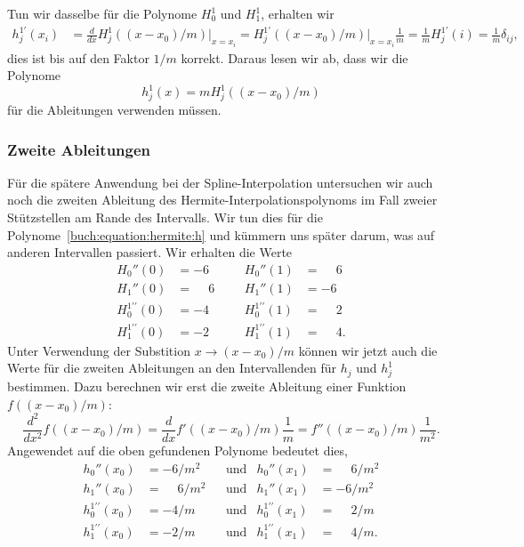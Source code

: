 Tun wir dasselbe für die Polynome $H_0^1$ und $H_1^1$, erhalten wir
\begin{align*}
h_j^{1\prime}(x_i)
&=
\frac{d}{dx} H_j^1((x-x_0)/m) \bigg|_{x=x_i}
=
H_j^{1\prime}((x-x_0)/m)\bigg|_{x=x_i} \frac{1}{m}
=
\frac1m
H_j^{1\prime}(i)
=
\frac1m\delta_{ij},
\end{align*}
dies ist bis auf den Faktor $1/m$ korrekt.
Daraus lesen wir ab, dass wir die Polynome
\[
h_j^1(x)
=
mH_j^1((x-x_0)/m)
\]
für die Ableitungen verwenden müssen.

\subsubsection{Zweite Ableitungen}
%
%
%
Für die spätere Anwendung bei der Spline-Interpolation untersuchen
wir auch noch die zweiten Ableitung des Hermite-Interpolationspolynoms
im Fall zweier Stützstellen am Rande des Intervalls.
Wir tun dies für die Polynome~\eqref{buch:equation:hermite:h}
und kümmern uns später darum, was auf anderen Intervallen passiert.
Wir erhalten die Werte
\[
\begin{aligned}
H_0''(0)                &= -6 &&&  H_0''(1)                &=  \phantom{-}6
\\
H_1''(0)                &=\phantom{-}6 &&&  H_1''(1)       &= -6
\\
H_0^{1\prime\prime}(0)  &= -4 &&&  H_0^{1\prime\prime}(1)  &=  \phantom{-}2
\\
H_1^{1\prime\prime}(0)  &= -2 &&&  H_1^{1\prime\prime}(1)  &=  \phantom{-}4.
\end{aligned}
\]
Unter Verwendung der Substition $x\to (x-x_0)/m$ können wir jetzt auch
die Werte für die zweiten Ableitungen an den Intervallenden für $h_j$ und
$h^1_j$ bestimmen.
Dazu berechnen wir erst die zweite Ableitung einer Funktion $f((x-x_0)/m)$:
\[
\frac{d^2}{dx^2} f((x-x_0)/m)
=
\frac{d}{dx} f'((x-x_0)/m) \frac1m
=
f''((x-x_0)/m) \frac1{m^2}.
\]
Angewendet auf die oben gefundenen Polynome bedeutet dies, 
\[
\begin{aligned}
h_0''(x_0) &=          - 6/m^2
&&\text{und}&
h_0''(x_1) &= \phantom{-}6/m^2 \\
h_1''(x_0) &= \phantom{-}6/m^2
&&\text{und}&
h_1''(x_1) &=          - 6/m^2 \\
h_0^{1\prime\prime}(x_0) &=           -4/m
&&\text{und}&
h_0^{1\prime\prime}(x_1) &= \phantom{-}2/m \\
h_1^{1\prime\prime}(x_0) &=          - 2/m
&&\text{und}&
h_1^{1\prime\prime}(x_1) &= \phantom{-}4/m.
\end{aligned}
\]






